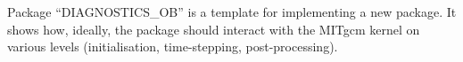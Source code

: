 
Package ``DIAGNOSTICS_OB'' is a template for implementing a new package.
It shows how, ideally, the package should interact with the
MITgcm kernel on various levels (initialisation, time-stepping,
post-processing).
